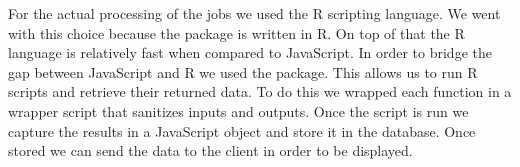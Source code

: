 For the actual processing of the jobs we used the R scripting language. We went with this choice because the  package is written in R. On top of that the R language is relatively fast when compared to JavaScript. In order to bridge the gap between JavaScript and R we used the  package. This allows us to run R scripts and retrieve their returned data. To do this we wrapped each  function in a wrapper script that sanitizes inputs and outputs. Once the script is run we capture the results in a JavaScript object and store it in the database. Once stored we can send the data to the client in order to be displayed.\par